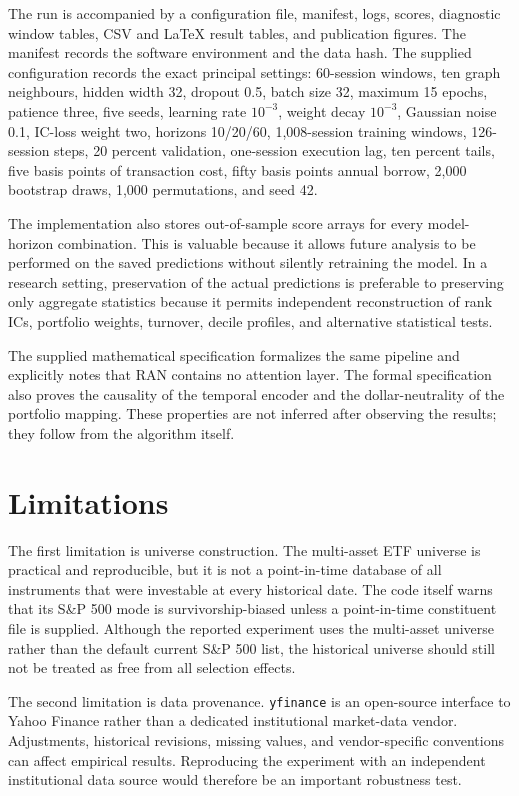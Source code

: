 \documentclass[10pt]{article}
\begin{document}
The run is accompanied by a configuration file, manifest, logs, scores, diagnostic window tables, CSV and LaTeX result tables, and publication figures. The manifest records the software environment and the data hash. The supplied configuration records the exact principal settings: 60-session windows, ten graph neighbours, hidden width 32, dropout 0.5, batch size 32, maximum 15 epochs, patience three, five seeds, learning rate $10^{-3}$, weight decay $10^{-3}$, Gaussian noise 0.1, IC-loss weight two, horizons 10/20/60, 1,008-session training windows, 126-session steps, 20 percent validation, one-session execution lag, ten percent tails, five basis points of transaction cost, fifty basis points annual borrow, 2,000 bootstrap draws, 1,000 permutations, and seed 42.

The implementation also stores out-of-sample score arrays for every model-horizon combination. This is valuable because it allows future analysis to be performed on the saved predictions without silently retraining the model. In a research setting, preservation of the actual predictions is preferable to preserving only aggregate statistics because it permits independent reconstruction of rank ICs, portfolio weights, turnover, decile profiles, and alternative statistical tests.

The supplied mathematical specification formalizes the same pipeline and explicitly notes that RAN contains no attention layer. The formal specification also proves the causality of the temporal encoder and the dollar-neutrality of the portfolio mapping. These properties are not inferred after observing the results; they follow from the algorithm itself.

\section{Limitations}

The first limitation is universe construction. The multi-asset ETF universe is practical and reproducible, but it is not a point-in-time database of all instruments that were investable at every historical date. The code itself warns that its S\&P 500 mode is survivorship-biased unless a point-in-time constituent file is supplied. Although the reported experiment uses the multi-asset universe rather than the default current S\&P 500 list, the historical universe should still not be treated as free from all selection effects.

The second limitation is data provenance. \texttt{yfinance} is an open-source interface to Yahoo Finance rather than a dedicated institutional market-data vendor. Adjustments, historical revisions, missing values, and vendor-specific conventions can affect empirical results. Reproducing the experiment with an independent institutional data source would therefore be an important robustness test.
\end{document}
